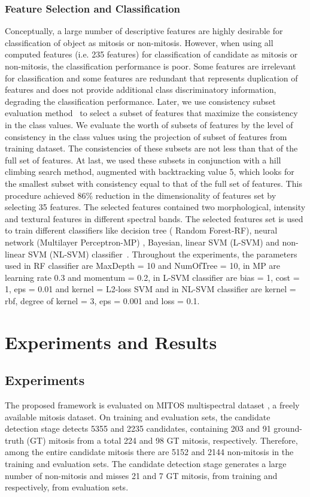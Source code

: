 \documentclass[10pt,twocolumn,letterpaper]{article}
\begin{document}
\subsubsection{Feature Selection and Classification}
Conceptually, a large number of descriptive features are highly desirable for classification of object as mitosis or non-mitosis. However, when using all computed features (i.e. 235 features) for classification of candidate as mitosis or non-mitosis, the classification performance is poor. Some features are irrelevant for classification and some features are redundant that represents duplication of features and does not provide additional class discriminatory information, degrading the classification performance. Later, we use consistency subset evaluation method~\cite{liu96} to select a subset of features that maximize the consistency in the class values. We evaluate the worth of subsets of features by the level of consistency in the class values using the projection of subset of features from training dataset. The consistencies of these subsets are not less than that of the full set of features. At last, we used these subsets in conjunction with a hill climbing search method, augmented with backtracking value 5, which looks for the smallest subset with consistency equal to that of the full set of features. This procedure achieved 86\% reduction in the dimensionality of features set by selecting 35 features. The selected features contained two morphological, intensity and textural features in different spectral bands. The selected features set is used to train different classifiers like decision tree ( Random Forest-RF), neural network (Multilayer Perceptron-MP) , Bayesian, linear SVM (L-SVM) and non-linear SVM (NL-SVM) classifier~\cite{weka12}. Throughout the experiments, the parameters used in RF classifier are MaxDepth = 10 and NumOfTree = 10, in MP are learning rate 0.3 and momentum = 0.2, in L-SVM classifier are bias = 1, cost = 1, eps = 0.01 and kernel = L2-loss SVM and in NL-SVM classifier are kernel = rbf, degree of kernel = 3, eps = 0.001 and loss = 0.1.

\section{Experiments and Results}
\label{sec:results}
\subsection{Experiments}
The proposed framework is evaluated on MITOS multispectral dataset \cite{mITOS2012}, a freely available mitosis dataset. On training and evaluation sets, the candidate detection stage detects 5355 and 2235 candidates, containing 203 and 91 ground-truth (GT) mitosis from a total 224 and 98 GT mitosis, respectively. Therefore, among the entire candidate mitosis there are 5152 and 2144 non-mitosis in the training and evaluation sets. The candidate detection stage generates a large number of non-mitosis and misses 21 and 7 GT mitosis, from training and respectively, from evaluation sets. 
\end{document}
